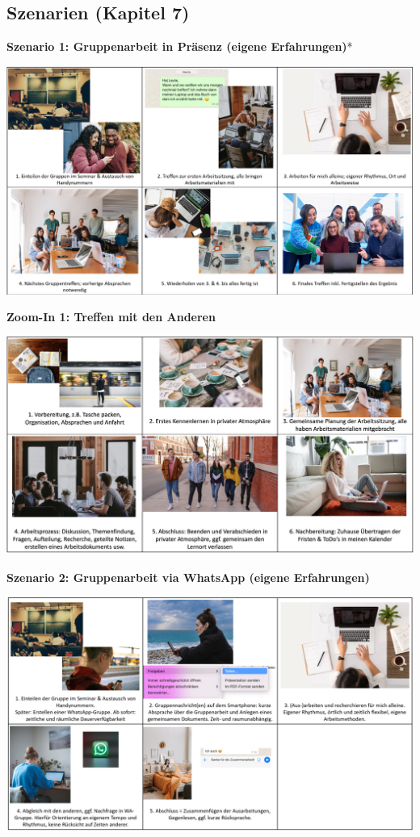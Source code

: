 \documentclass[
  a4paper,
]{book}
\begin{document}
\subsection*{Szenarien (Kapitel 7)}\label{szenarien-kapitel-7-1}

\textbf{Szenario 1: Gruppenarbeit in Präsenz (eigene Erfahrungen)}*

\begin{center}\includegraphics{Figures/07-Bsp.-Whatsapp1} \end{center}

{\textbf{Zoom-In 1: Treffen mit den Anderen}}

\begin{center}\includegraphics{Figures/Zoom-in1} \end{center}

\textbf{Szenario 2: Gruppenarbeit via WhatsApp (eigene Erfahrungen)}

\begin{center}\includegraphics{Figures/07-Bsp.-Whatsapp2} \end{center}
\end{document}
